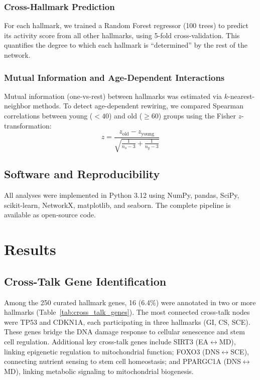 \documentclass[11pt,a4paper]{article}
\begin{document}
\subsubsection{Cross-Hallmark Prediction}
For each hallmark, we trained a Random Forest regressor (100 trees) to predict its activity score from all other hallmarks, using 5-fold cross-validation. This quantifies the degree to which each hallmark is ``determined'' by the rest of the network.

\subsubsection{Mutual Information and Age-Dependent Interactions}
Mutual information (one-vs-rest) between hallmarks was estimated via $k$-nearest-neighbor methods. To detect age-dependent rewiring, we compared Spearman correlations between young ($<40$) and old ($\geq 60$) groups using the Fisher $z$-transformation:
\begin{equation}
    z = \frac{z_{\text{old}} - z_{\text{young}}}{\sqrt{\frac{1}{n_o-3} + \frac{1}{n_y-3}}}
\end{equation}

\subsection{Software and Reproducibility}

All analyses were implemented in Python 3.12 using NumPy, pandas, SciPy, scikit-learn, NetworkX, matplotlib, and seaborn. The complete pipeline is available as open-source code.

\section{Results}

\subsection{Cross-Talk Gene Identification}

Among the 250 curated hallmark genes, 16 (6.4\%) were annotated in two or more hallmarks (Table~\ref{tab:cross_talk_genes}). The most connected cross-talk nodes were TP53 and CDKN1A, each participating in three hallmarks (GI, CS, SCE). These genes bridge the DNA damage response to cellular senescence and stem cell regulation. Additional key cross-talk genes include SIRT3 (EA$\leftrightarrow$MD), linking epigenetic regulation to mitochondrial function; FOXO3 (DNS$\leftrightarrow$SCE), connecting nutrient sensing to stem cell homeostasis; and PPARGC1A (DNS$\leftrightarrow$MD), linking metabolic signaling to mitochondrial biogenesis.
\end{document}

